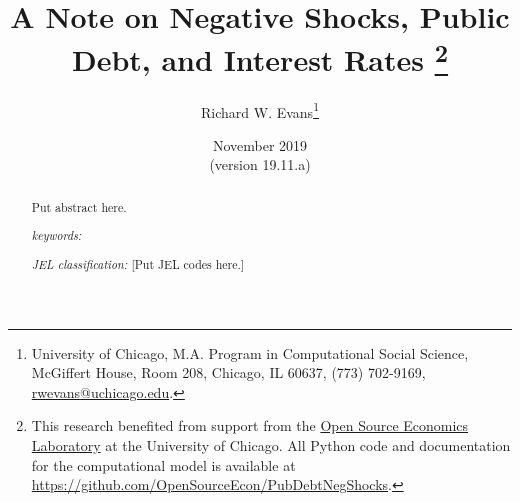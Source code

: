 \documentclass[letterpaper,12pt]{article}
\theoremstyle{definition}
\begin{document}
\begin{titlepage}
\title{A Note on Negative Shocks, Public Debt, and Interest Rates \thanks{This research benefited from support from the \href{https://www.oselab.org/}{Open Source Economics Laboratory} at the University of Chicago. All Python code and documentation for the computational model is available at \href{https://github.com/OpenSourceEcon/PubDebtNegShocks}{https://github.com/OpenSourceEcon/PubDebtNegShocks}.}
}
\author{
  Richard W. Evans\footnote{University of Chicago, M.A. Program in Computational Social Science, McGiffert House, Room 208, Chicago, IL 60637, (773) 702-9169, \href{mailto:rwevans@uchicago.edu}{rwevans@uchicago.edu}.}
  }
\date{{\footnotesize{November 2019}} \\
  {\scriptsize{(version 19.11.a)}}}
\maketitle
\vspace{-9mm}
\begin{abstract}
  Put abstract here.
  \vspace{3mm}

  \noindent\textit{keywords:}

  \vspace{3mm}

  \noindent\textit{JEL classification:} [Put JEL codes here.]

\end{abstract}
\thispagestyle{empty}
\end{titlepage}
\end{document}
